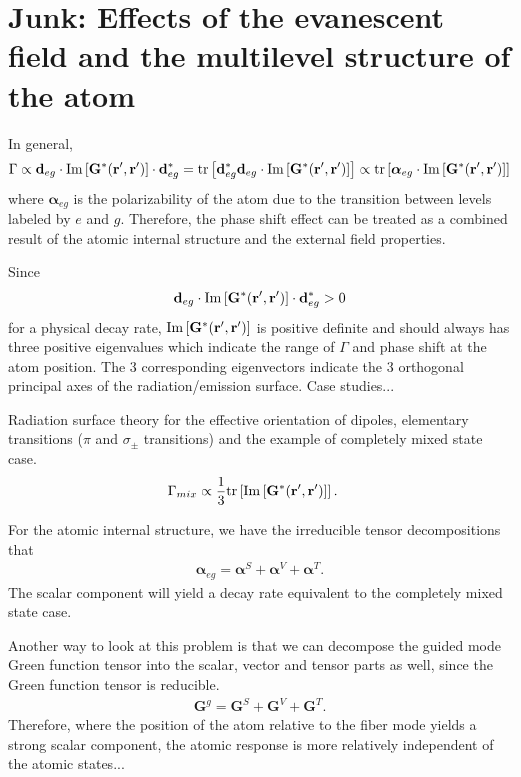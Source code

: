 \documentclass[preprint,aps,pra,onecolumn]{revtex4-1} %
\begin{document}
\section{Junk: Effects of the evanescent field and the multilevel structure of the atom}
In general, 
\begin{align}
\Gamma \propto \mathbf{d}_{eg}\cdot \mathrm{Im}\left[\mathbf{G}^*(\mathbf{r}',\mathbf{r}') \right]\cdot\mathbf{d}_{eg}^*=\mathrm{tr}\left[\mathbf{d}_{eg}^*\mathbf{d}_{eg}\cdot \mathrm{Im}\left[\mathbf{G}^*(\mathbf{r}',\mathbf{r}') \right] \right]\propto \mathrm{tr}\left[\boldsymbol{\alpha}_{eg}\cdot \mathrm{Im}\left[\mathbf{G}^*(\mathbf{r}',\mathbf{r}') \right] \right]
\end{align}
where $ \boldsymbol{\alpha}_{eg} $ is the polarizability of the atom due to the transition between levels labeled by $ e$ and $g $. Therefore, the phase shift effect can be treated as a combined result of the atomic internal structure and the external field properties. 

Since 
\begin{align}
\mathbf{d}_{eg}\cdot \mathrm{Im}\left[\mathbf{G}^*(\mathbf{r}',\mathbf{r}') \right]\cdot\mathbf{d}_{eg}^*>0
\end{align}
for a physical decay rate, $\mathrm{Im}\left[\mathbf{G}^*(\mathbf{r}',\mathbf{r}')\right]$ is positive definite and should always has three positive eigenvalues which indicate the range of $ \Gamma $ and phase shift at the atom position. The 3 corresponding eigenvectors indicate the 3 orthogonal principal axes of the radiation/emission surface. Case studies...

Radiation surface theory for the effective orientation of dipoles, elementary transitions ($ \pi $ and $ \sigma_\pm $ transitions) and the example of completely mixed state case. 
\begin{align}
\Gamma_{mix} &\propto \frac{1}{3} \mathrm{tr}\left[ \mathrm{Im}\left[\mathbf{G}^*(\mathbf{r}',\mathbf{r}')\right] \right].
\end{align}

For the atomic internal structure, we have the irreducible tensor decompositions that 
\begin{align}
\boldsymbol{\alpha}_{eg} = \boldsymbol{\alpha}^S + \boldsymbol{\alpha}^V + \boldsymbol{\alpha}^T.
\end{align}
The scalar component will yield a decay rate equivalent to the completely mixed state case. 

Another way to look at this problem is that we can decompose the guided mode Green function tensor into the scalar, vector and tensor parts as well, since the Green function tensor is reducible.
\begin{align}
\mathbf{G}^g=\mathbf{G}^S+\mathbf{G}^V+\mathbf{G}^T.
\end{align}
Therefore, where the position of the atom relative to the fiber mode yields a strong scalar component, the atomic response is more relatively independent of the atomic states... 
\end{document}
